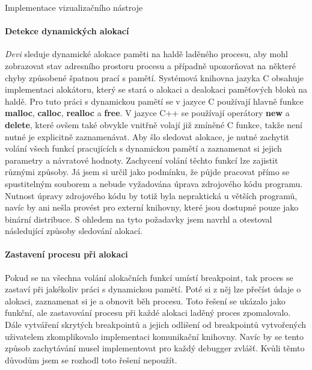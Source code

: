 \documentclass[czech,bachelor,male,python,dept460]{diploma}						%
\begin{document}
\begin{section}{Implementace vizualizačního nástroje}
		\paragraph*{Detekce dynamických alokací}
			\textit{Devi} sleduje dynamické alokace paměti na haldě laděného procesu, aby mohl zobrazovat stav adresního prostoru procesu a případně upozorňovat na
			některé chyby způsobené špatnou prací s pamětí. Systémová knihovna jazyka C obsahuje implementaci alokátoru, který se stará o alokaci a dealokaci paměťových
			bloků na haldě. Pro tuto práci s dynamickou pamětí se v jazyce C používají hlavně funkce \textbf{malloc}, \textbf{calloc}, \textbf{realloc}
			a \textbf{free}. V jazyce C++ se používají operátory \textbf{new} a \textbf{delete}, které ovšem také obvykle vnitřně volají již zmíněné C funkce,
			takže není nutné je explicitně zaznamenávat. Aby šlo sledovat alokace, je nutné zachytit volání všech funkcí pracujících s dynamickou pamětí a zaznamenat si
			jejich parametry a návratové hodnoty. Zachycení volání těchto funkcí lze zajistit různými způsoby. Já jsem si určil jako podmínku, že půjde pracovat
			přímo se spustitelným souborem a nebude vyžadována úprava zdrojového kódu programu.
			Nutnost úpravy zdrojového kódu by totiž byla nepraktická u větších programů, navíc by ani nešla provést pro externí knihovny, které jsou dostupné pouze
			jako binární distribuce.
			S ohledem na tyto požadavky jsem navrhl a otestoval následující způsoby sledování alokací.
				\paragraph*{Zastavení procesu při alokaci} Pokud se na všechna volání alokačních funkcí umístí breakpoint, tak proces se zastaví při jakékoliv práci s
				dynamickou pamětí. Poté si z něj lze přečíst údaje o alokaci, zaznamenat si je a obnovit běh procesu. Toto řešení se ukázalo jako funkční,
				ale zastavování procesu při každé alokaci laděný proces zpomalovalo. Dále vytváření skrytých breakpointů a jejich odlišení od breakpointů vytvořených
				uživatelem zkomplikovalo implementaci komunikační knihovny. Navíc by se tento způsob zachytávání musel
				implementovat pro každý debugger zvlášť. Kvůli těmto důvodům jsem se rozhodl toto řešení nepoužít.
				

\end{section}
\end{document}
